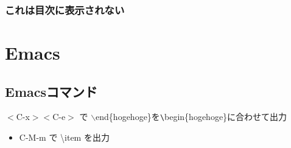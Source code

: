 \documentclass{jsarticle}
\begin{document}
\subsubsection{これは目次に表示されない}

\hoge %




\newpage %

\thispagestyle{empty} %

\section{Emacs}
\subsection{Emacsコマンド}
$< $C-x$>< $C-e$>$ で $\backslash $end\{hogehoge\}を\verb|\|begin\{hogehoge\}に合わせて出力

\begin{itemize}
\item C-M-m で \textbackslash item を出力
\end{itemize}

\clearpage %


\end{document}
